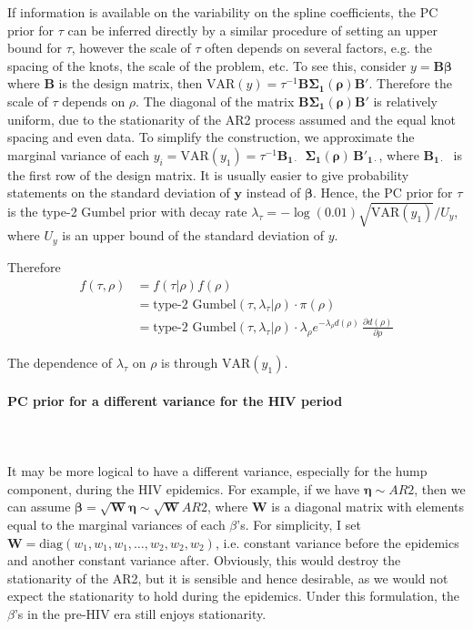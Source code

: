 \documentclass[12pt,a4paper]{article}
\begin{document}
If information is available on the variability on the spline coefficients, the PC prior for $\tau$ can be inferred directly by a similar procedure of setting an upper bound for $\tau$, however the scale of $\tau$ often depends on several factors, e.g. the spacing of the knots, the scale of the problem, etc. To see this, consider $y = \boldsymbol{B\beta}$ where $\boldsymbol{B}$ is the design matrix, then $\text{VAR}(y) = \tau^{-1}\boldsymbol{B \Sigma_1(\rho) B'}$. Therefore the scale of $\tau$ depends on $\rho$. The diagonal of the matrix $\boldsymbol{B \Sigma_1(\rho) B'}$ is relatively uniform, due to the stationarity of the AR2 process assumed and the equal knot spacing and even data. To simplify the construction, we approximate the marginal variance of each $y_i = \text{VAR}(y_1) = \tau^{-1} \boldsymbol{B_{1\cdot}\phantom{'} \, \Sigma_1{(\rho)} \, B'_{1\cdot}}$, where $\boldsymbol{B_{1\cdot}\phantom{'}}$ is the first row of the design matrix. It is usually easier to give probability statements on the standard deviation of $\boldsymbol{y}$ instead of $\boldsymbol{\beta}$. Hence, the PC prior for $\tau$ is the type-2 Gumbel prior with decay rate $\lambda_{\tau} = -\log(0.01) \sqrt{\text{VAR}(y_1)}/ U_{y}$, where $U_y$ is an upper bound of the standard deviation of $y$.

Therefore
\begin{align*}
f(\tau, \rho) &= f(\tau | \rho) f(\rho) \\
&= \text{type-2 Gumbel}(\tau, \lambda_{\tau}|\rho) \cdot \pi(\rho) \\
&= \text{type-2 Gumbel}(\tau, \lambda_{\tau}|\rho) \cdot  \lambda_{\rho} e^{-\lambda_{\rho} d(\rho)} \, \frac{\partial d(\rho)}{\partial \rho}
\end{align*}

The dependence of $\lambda_{\tau}$ on $\rho$ is through $\text{VAR}(y_1)$.

\paragraph{PC prior for a different variance for the HIV period} \\~\\
It may be more logical to have a different variance, especially for the hump component, during the HIV epidemics. For example, if we have $\boldsymbol{\eta} \sim AR2$, then we can assume $\boldsymbol{\beta} = \boldsymbol{\sqrt{W}\eta} \sim \boldsymbol{\sqrt{W}} AR2$, where $\boldsymbol{W}$ is a diagonal matrix with elements equal to the marginal variances of each $\beta$'s. For simplicity, I set $\boldsymbol{W} = \text{diag}(w_1, w_1, w_1, \dots, w_2, w_2, w_2)$, i.e. constant variance before the epidemics and another constant variance after. Obviously, this would destroy the stationarity of the AR2, but it is sensible and hence desirable, as we would not expect the stationarity to hold during the epidemics. Under this formulation, the $\beta$'s in the pre-HIV era still enjoys stationarity.
\end{document}
